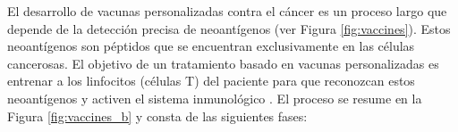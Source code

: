 


El desarrollo de vacunas personalizadas contra el cáncer es un proceso largo que depende de la detección precisa de neoantígenos (ver Figura \ref{fig:vaccines}). Estos neoantígenos son péptidos que se encuentran exclusivamente en las células cancerosas. El objetivo de un tratamiento basado en vacunas personalizadas es entrenar a los linfocitos (células T) del paciente para que reconozcan estos neoantígenos y activen el sistema inmunológico \citep{de2020neoantigen, peng2019neoantigen}. El proceso se resume en la Figura \ref{fig:vaccines_b} y consta de las siguientes fases:


